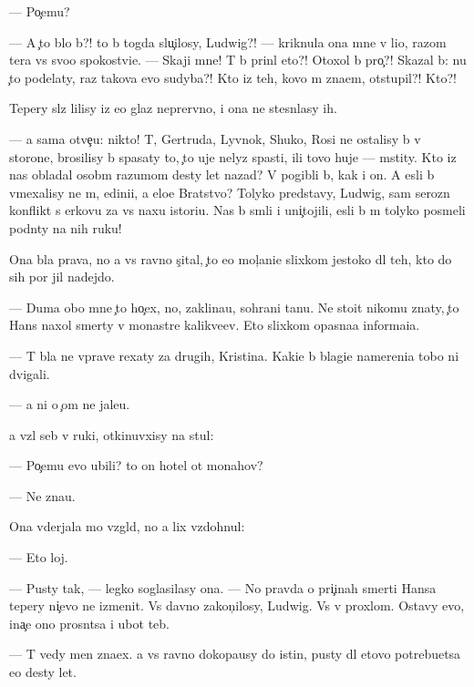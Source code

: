 \documentclass[10pt]{book}
\begin{document}
— Po{\c}emu?

— A {\c}to b{\yi}lo b{\yi}?! {\C}to b{\yi} togda slu{\c}ilosy, Ludwig?! — kriknula ona mne v li{\q}o, razom ter{\ia}{\y}a vs{\e} svo{\y}o spoko{\y}stvi{\y}e. — Skaji mne! T{\yi} b{\yi} prin{\ia}l eto?! Otoxol b{\yi} pro{\c}?! Skazal b{\yi}: nu {\c}to podelaty, raz takova {\y}evo sudyba?! Kto iz teh, kovo m{\yi} zna{\y}em, otstupil?! Kto?!

Tepery sl{\e}z{\yi} lilisy iz {\y}e{\y}o glaz neprer{\yi}vno, i ona ne stesn{\ia}lasy ih.

— {\Y}a sama otve{\c}u: nikto! T{\yi}, Gertruda, Lyv{\e}nok, Shuko, Rosi ne ostalisy b{\yi} v storone, brosilisy b{\yi} spasaty to, {\c}to uje nelyz{\ia} spasti, ili tovo huje — mstity. Kto iz nas obladal osob{\yi}m razumom des{\ia}ty let nazad? V{\yi} pogibli b{\yi}, kak i on. A {\y}esli b{\yi} vmexalisy ne m{\yi}, {\y}edini{\q}i, a {\q}elo{\y}e Bratstvo? Tolyko predstavy, Ludwig, sam{\yi}{\y} ser{\y}ozn{\yi}{\y} konflikt s {\Q}erkov{\y}u za vs{\iu} naxu istori{\y}u. Nas b{\yi} sm{\ia}li i uni{\c}tojili, {\y}esli b{\yi} m{\yi} tolyko posmeli podn{\ia}ty na nih ruku!

Ona b{\yi}la prava, no {\y}a vs{\e} ravno s{\c}ital, {\c}to {\y}e{\y}o mol{\c}ani{\y}e slixkom jestoko dl{\ia} teh, kto do sih por jil nadejdo{\y}.

— Duma{\y} obo mne {\c}to ho{\c}ex, no, zaklina{\y}u, sohrani ta{\y}nu. Ne sto{\y}it nikomu znaty, {\c}to Hans naxol smerty v monast{\yi}re kalikve{\q}ev. Eto slixkom opasna{\y}a informa{\q}i{\y}a.

— T{\yi} b{\yi}la ne vprave rexaty za drugih, Kristina. Kaki{\y}e b{\yi} blagi{\y}e namereni{\y}a tobo{\y} ni dvigali.

— {\Y}a ni o {\c}om ne jale{\y}u.

{\Y}a vz{\ia}l seb{\ia} v ruki, otkinuvxisy na stul:

— Po{\c}emu {\y}evo ubili? {\C}to on hotel ot monahov?

— Ne zna{\y}u.

Ona v{\yi}derjala mo{\y} vzgl{\ia}d, no {\y}a lix vzdohnul:

— Eto loj.

— Pusty tak, — legko soglasilasy ona. — No pravda o pri{\c}inah smerti Hansa tepery ni{\c}evo ne izmenit. Vs{\e} davno zakon{\c}ilosy, Ludwig. Vs{\e} v proxlom. Ostavy {\y}evo, ina{\c}e ono prosn{\e}tsa i ub{\y}ot teb{\ia}.

— T{\yi} vedy men{\ia} zna{\y}ex. {\Y}a vs{\e} ravno dokopa{\y}usy do istin{\yi}, pusty dl{\ia} etovo potrebu{\y}etsa {\y}e{\x}o des{\ia}ty let.
\end{document}
